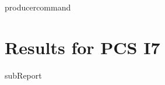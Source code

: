 {{ producercommand }}
\renewcommand{\DTRPcs}{I7} %
\renewcommand{\DTRPcsLong}{I7}


    \section{Results for PCS \DTRPcsLong}

    {{subReport}}
    \newpage

